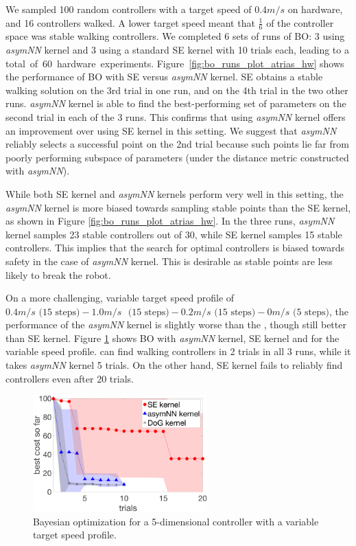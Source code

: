 We sampled 100 random controllers with a target speed of $0.4m/s$ on hardware, and 16 controllers walked. A lower target speed meant that $\frac{1}{6}$ of the controller space was stable walking controllers. We completed 6 sets of runs of BO: 3 using \textit{asymNN} kernel and 3 using a standard SE kernel with 10 trials each, leading to a \mbox{total of 60 hardware experiments}. Figure~\ref{fig:bo_runs_plot_atrias_hw} shows the performance of BO with SE versus \textit{asymNN} kernel. SE obtains a stable walking solution on the 3rd trial in one run, and on the 4th trial in the two other runs. \textit{asymNN} kernel is able to find the best-performing set of parameters on the second trial in each of the 3 runs. This confirms that using \textit{asymNN} kernel offers an improvement over using SE kernel in this setting. We suggest that \textit{asymNN} reliably selects a successful point on the 2nd trial  because such points lie far from  poorly performing subspace of parameters (under the distance metric constructed with \textit{asymNN}). 

While both SE kernel and \textit{asymNN} kernels perform very well in this setting, the \textit{asymNN} kernel is more biased towards sampling stable points than the SE kernel, as shown in Figure \ref{fig:bo_runs_plot_atrias_hw}. In the three runs, \textit{asymNN} kernel samples 23 stable controllers out of 30, while SE kernel samples 15 stable controllers. This implies that the search for optimal controllers is biased towards safety in the case of \textit{asymNN} kernel. This is desirable as stable points are less likely to break the robot.



On a more challenging, variable target speed profile of $0.4 m/s \text{ (15 steps)} - 1.0 m/s$ $\text{ (15 steps)} - 0.2 m/s \text{ (15 steps)} - 0 m/s \text{ (5 steps)}$, the performance of the \textit{asymNN} kernel is slightly worse than the \dogkernel, though still better than SE kernel. Figure \ref{fig:bo_nn_all_3} shows BO with  \textit{asymNN} kernel, SE kernel and \dogkernel for the variable speed profile. \dogkernel can find walking controllers in 2 trials in all 3 runs, while it takes \textit{asymNN} kernel 5 trials. On the other hand, SE kernel fails to reliably find controllers even after 20 trials.

\begin{figure}
    \centering
    \includegraphics[width = 0.6\textwidth]{img/bo_nn_all_3.png}
    \caption{Bayesian optimization for a 5-dimensional controller with a variable target speed profile.}
    \label{fig:bo_nn_all_3}
\end{figure}


